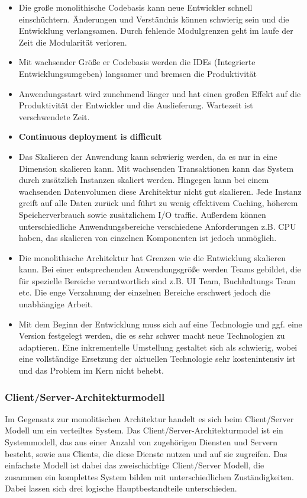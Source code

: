 	\begin{itemize}
	\item Die große monolithische Codebasis kann neue Entwickler schnell einschüchtern. Änderungen und Verständnis können schwierig sein und die Entwicklung verlangsamen. Durch fehlende Modulgrenzen geht im laufe der Zeit die Modularität verloren.
	\item Mit wachsender Größe er Codebasis werden die IDEs (Integrierte Entwicklungsumgeben) langsamer und bremsen die Produktivität
	\item Anwendungsstart wird zunehmend länger und hat einen großen Effekt auf die Produktivität der Entwickler und die Auslieferung. Wartezeit ist verschwendete Zeit.
	\item \textbf{Continuous deployment is difficult }
	\item Das Skalieren der Anwendung kann schwierig werden, da es nur in eine Dimension skalieren kann. Mit wachsenden Transaktionen kann das System durch zusätzlich Instanzen skaliert werden. Hingegen kann bei einem wachsenden Datenvolumen diese Architektur nicht gut skalieren. Jede Instanz greift auf alle Daten zurück und führt zu wenig effektivem Caching, höherem Speicherverbrauch sowie zusätzlichem I/O traffic. Außerdem können unterschiedliche Anwendungsbereiche verschiedene Anforderungen z.B. CPU haben, das skalieren von einzelnen Komponenten ist jedoch unmöglich.
	\item Die monolithische Architektur hat Grenzen wie die Entwicklung skalieren kann. Bei einer entsprechenden Anwendungsgröße werden Teams gebildet, die für spezielle Bereiche verantwortlich sind z.B. UI Team, Buchhaltungs Team etc.
	Die enge Verzahnung der einzelnen Bereiche erschwert jedoch die unabhängige Arbeit.
	\item Mit dem Beginn der Entwicklung muss sich auf eine Technologie und ggf. eine Version festgelegt werden, die es sehr schwer macht neue Technologien zu adaptieren. Eine inkrementelle Umstellung gestaltet sich als schwierig, wobei eine vollständige Ersetzung der aktuellen Technologie sehr kostenintensiv ist und das Problem im Kern nicht behebt.
	\end{itemize}
	
	\subsubsection{Client/Server-Architekturmodell}
	Im Gegensatz zur monolitischen Architektur handelt es sich beim Client/Server Modell um ein verteiltes System.
	Das Client/Server-Architekturmodel ist ein Systemmodell, das aus einer Anzahl von zugehörigen Diensten und Servern besteht, sowie aus Clients, die diese Dienste nutzen und auf sie zugreifen. Das einfachste Modell ist dabei das zweischichtige Client/Server Modell, die zusammen ein komplettes System bilden mit unterschiedlichen Zuständigkeiten. \\
	Dabei lassen sich drei logische Hauptbestandteile unterschieden.
	
